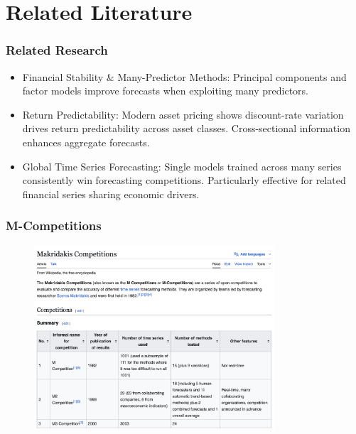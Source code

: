 \documentclass[ignorenonframetext, 9pt]{beamer}
\begin{document}
\section{Related Literature}

\begin{frame}
  \frametitle{Related Research}
  \begin{itemize}
  \item \alert{Financial Stability \& Many-Predictor Methods:}
  Principal components and factor models improve forecasts when exploiting many predictors.
  \\ 
  \vspace{0.3cm}
  \item \alert{Return Predictability:}
  Modern asset pricing shows discount-rate variation drives return predictability across asset classes. Cross-sectional information enhances aggregate forecasts.
  \\ 
  \vspace{0.3cm}
  \item \alert{Global Time Series Forecasting:}
  Single models trained across many series consistently win forecasting competitions. Particularly effective for related financial series sharing economic drivers.
  \\ 
  \end{itemize}
\end{frame}

\begin{frame}
  \frametitle{M-Competitions}
\begin{figure}
    \centering
    \includegraphics[width=0.8\textwidth]{../docs_src/m_competitions.png}
\end{figure}
\end{frame}
\end{document}
